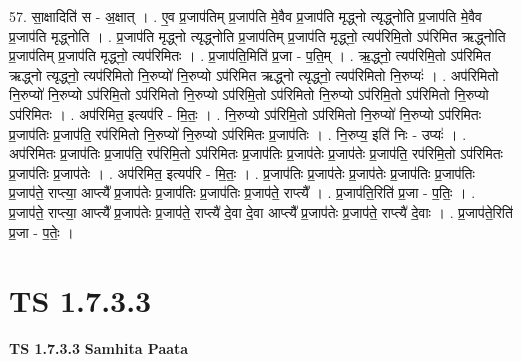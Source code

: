 \documentclass[17pt]{extarticle}
\begin{document}
57. सा॒क्षादिति॑ स - अ॒क्षात् । . ए॒व प्र॒जाप॑तिम् प्र॒जाप॑ति मे॒वैव प्र॒जाप॑ति मृद्ध्नो त्यृद्ध्नोति प्र॒जाप॑ति मे॒वैव प्र॒जाप॑ति मृद्ध्नोति । . प्र॒जाप॑ति मृद्ध्नो त्यृद्ध्नोति प्र॒जाप॑तिम् प्र॒जाप॑ति मृद्ध्नो॒ त्यप॑रिमि॒तो ऽप॑रिमित ऋद्ध्नोति प्र॒जाप॑तिम् प्र॒जाप॑ति मृद्ध्नो॒ त्यप॑रिमितः । . प्र॒जाप॑ति॒मिति॑ प्र॒जा - प॒ति॒म् । . ऋ॒द्ध्नो॒ त्यप॑रिमि॒तो ऽप॑रिमित ऋद्ध्नो त्यृद्ध्नो॒ त्यप॑रिमितो नि॒रुप्यो॑ नि॒रुप्यो ऽप॑रिमित ऋद्ध्नो त्यृद्ध्नो॒ त्यप॑रिमितो नि॒रुप्यः॑ । . अप॑रिमितो नि॒रुप्यो॑ नि॒रुप्यो ऽप॑रिमि॒तो ऽप॑रिमितो नि॒रुप्यो ऽप॑रिमि॒तो ऽप॑रिमितो नि॒रुप्यो ऽप॑रिमि॒तो ऽप॑रिमितो नि॒रुप्यो ऽप॑रिमितः । . अप॑रिमित॒ इत्यप॑रि - मि॒तः॒ । . नि॒रुप्यो ऽप॑रिमि॒तो ऽप॑रिमितो नि॒रुप्यो॑ नि॒रुप्यो ऽप॑रिमितः प्र॒जाप॑तिः प्र॒जाप॑ति॒ रप॑रिमितो नि॒रुप्यो॑ नि॒रुप्यो ऽप॑रिमितः प्र॒जाप॑तिः । . नि॒रुप्य॒ इति॑ निः - उप्यः॑ । . अप॑रिमितः प्र॒जाप॑तिः प्र॒जाप॑ति॒ रप॑रिमि॒तो ऽप॑रिमितः प्र॒जाप॑तिः प्र॒जाप॑तेः प्र॒जाप॑तेः प्र॒जाप॑ति॒ रप॑रिमि॒तो ऽप॑रिमितः प्र॒जाप॑तिः प्र॒जाप॑तेः । . अप॑रिमित॒ इत्यप॑रि - मि॒तः॒ । . प्र॒जाप॑तिः प्र॒जाप॑तेः प्र॒जाप॑तेः प्र॒जाप॑तिः प्र॒जाप॑तिः प्र॒जाप॑ते॒ राप्त्या॒ आप्त्यै᳚ प्र॒जाप॑तेः प्र॒जाप॑तिः प्र॒जाप॑तिः प्र॒जाप॑ते॒ राप्त्यै᳚ । . प्र॒जाप॑ति॒रिति॑ प्र॒जा - प॒तिः॒ । . प्र॒जाप॑ते॒ राप्त्या॒ आप्त्यै᳚ प्र॒जाप॑तेः प्र॒जाप॑ते॒ राप्त्यै॑ दे॒वा दे॒वा आप्त्यै᳚ प्र॒जाप॑तेः प्र॒जाप॑ते॒ राप्त्यै॑ दे॒वाः । . प्र॒जाप॑ते॒रिति॑ प्र॒जा - प॒तेः॒ । \newline
\pagebreak
{}
\section*{ TS 1.7.3.3 }

\textbf{TS 1.7.3.3 } \newline
\textbf{Samhita Paata} \newline
\end{document}
